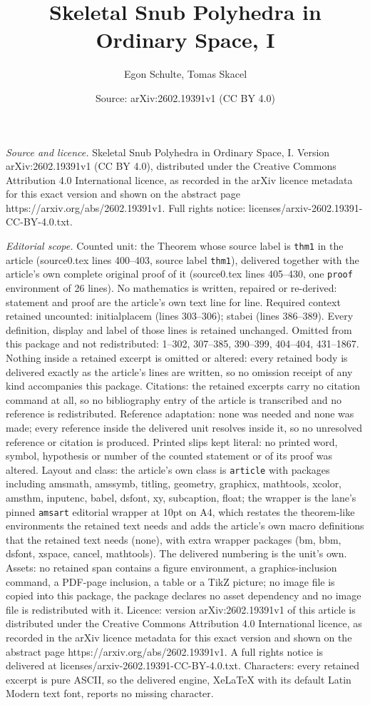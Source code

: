 \documentclass[10pt,a4paper]{amsart}
\title[Skeletal Snub Polyhedra in Ordinary Space, I]{Skeletal Snub Polyhedra in Ordinary Space, I}
\author{Egon Schulte, Tomas Skacel}
\date{Source: arXiv:2602.19391v1 (CC BY 4.0)}
\begin{document}
\maketitle

\noindent\emph{Source and licence.} Skeletal Snub Polyhedra in Ordinary Space, I. Version arXiv:2602.19391v1 (CC BY 4.0), distributed under the Creative Commons Attribution 4.0 International licence, as recorded in the arXiv licence metadata for this exact version and shown on the abstract page https://arxiv.org/abs/2602.19391v1. Full rights notice: licenses/arxiv-2602.19391-CC-BY-4.0.txt.\par\smallskip

\noindent\textit{Editorial scope.} Counted unit: the Theorem whose source label is \texttt{thm1} in the article (source0.tex lines 400--403, source label \texttt{thm1}), delivered together with the article's own complete original proof of it (source0.tex lines 405--430, one \texttt{proof} environment of 26 lines). No mathematics is written, repaired or re-derived: statement and proof are the article's own text line for line. Required context retained uncounted: initialplacem (lines 303--306); stabei (lines 386--389). Every definition, display and label of those lines is retained unchanged. Omitted from this package and not redistributed: 1--302, 307--385, 390--399, 404--404, 431--1867. Nothing inside a retained excerpt is omitted or altered: every retained body is delivered exactly as the article's lines are written, so no omission receipt of any kind accompanies this package. Citations: the retained excerpts carry no citation command at all, so no bibliography entry of the article is transcribed and no reference is redistributed. Reference adaptation: none was needed and none was made; every reference inside the delivered unit resolves inside it, so no unresolved reference or citation is produced. Printed slips kept literal: no printed word, symbol, hypothesis or number of the counted statement or of its proof was altered. Layout and class: the article's own class is \texttt{article} with packages including amsmath, amssymb, titling, geometry, graphicx, mathtools, xcolor, amsthm, inputenc, babel, dsfont, xy, subcaption, float; the wrapper is the lane's pinned \texttt{amsart} editorial wrapper at 10pt on A4, which restates the theorem-like environments the retained text needs and adds the article's own macro definitions that the retained text needs (none), with extra wrapper packages (bm, bbm, dsfont, xspace, cancel, mathtools). The delivered numbering is the unit's own. Assets: no retained span contains a figure environment, a graphics-inclusion command, a PDF-page inclusion, a table or a TikZ picture; no image file is copied into this package, the package declares no asset dependency and no image file is redistributed with it. Licence: version arXiv:2602.19391v1 of this article is distributed under the Creative Commons Attribution 4.0 International licence, as recorded in the arXiv licence metadata for this exact version and shown on the abstract page https://arxiv.org/abs/2602.19391v1. A full rights notice is delivered at licenses/arxiv-2602.19391-CC-BY-4.0.txt. Characters: every retained excerpt is pure ASCII, so the delivered engine, XeLaTeX with its default Latin Modern text font, reports no missing character.
\end{document}
